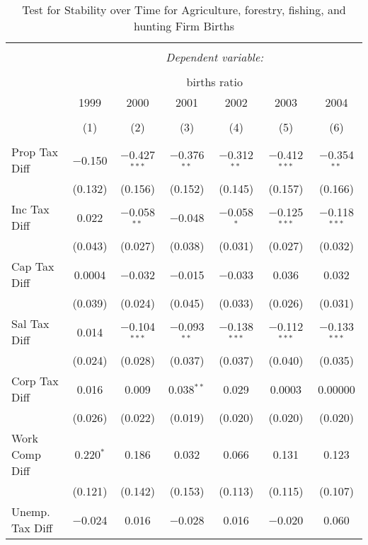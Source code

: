 
\begin{table}[!htbp] \centering 
  \caption{Test for Stability over Time for  Agriculture, forestry, fishing, and hunting Firm Births} 
  \label{11year} 
\small 
\begin{tabular}{@{\extracolsep{5pt}}lcccccc} 
\\[-1.8ex]\hline 
\hline \\[-1.8ex] 
 & \multicolumn{6}{c}{\textit{Dependent variable:}} \\ 
\cline{2-7} 
\\[-1.8ex] & \multicolumn{6}{c}{births ratio} \\ 
 & 1999 & 2000 & 2001 & 2002 & 2003 & 2004 \\ 
\\[-1.8ex] & (1) & (2) & (3) & (4) & (5) & (6)\\ 
\hline \\[-1.8ex] 
 Prop Tax Diff & $-$0.150 & $-$0.427$^{***}$ & $-$0.376$^{**}$ & $-$0.312$^{**}$ & $-$0.412$^{***}$ & $-$0.354$^{**}$ \\ 
  & (0.132) & (0.156) & (0.152) & (0.145) & (0.157) & (0.166) \\ 
  Inc Tax Diff & 0.022 & $-$0.058$^{**}$ & $-$0.048 & $-$0.058$^{*}$ & $-$0.125$^{***}$ & $-$0.118$^{***}$ \\ 
  & (0.043) & (0.027) & (0.038) & (0.031) & (0.027) & (0.032) \\ 
  Cap Tax Diff & 0.0004 & $-$0.032 & $-$0.015 & $-$0.033 & 0.036 & 0.032 \\ 
  & (0.039) & (0.024) & (0.045) & (0.033) & (0.026) & (0.031) \\ 
  Sal Tax Diff & 0.014 & $-$0.104$^{***}$ & $-$0.093$^{**}$ & $-$0.138$^{***}$ & $-$0.112$^{***}$ & $-$0.133$^{***}$ \\ 
  & (0.024) & (0.028) & (0.037) & (0.037) & (0.040) & (0.035) \\ 
  Corp Tax Diff & 0.016 & 0.009 & 0.038$^{**}$ & 0.029 & 0.0003 & 0.00000 \\ 
  & (0.026) & (0.022) & (0.019) & (0.020) & (0.020) & (0.020) \\ 
  Work Comp Diff & 0.220$^{*}$ & 0.186 & 0.032 & 0.066 & 0.131 & 0.123 \\ 
  & (0.121) & (0.142) & (0.153) & (0.113) & (0.115) & (0.107) \\ 
  Unemp. Tax Diff & $-$0.024 & 0.016 & $-$0.028 & 0.016 & $-$0.020 & 0.060 \\ 

\end{tabular}
\end{table}
